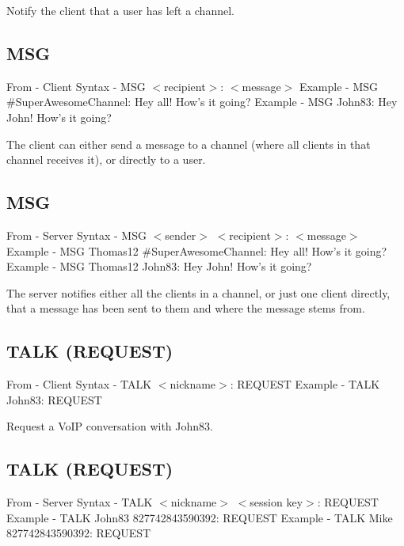 \documentclass[12pt]{rapport}
\begin{document}
\noindent Notify the client that a user has left a channel.

\subsection*{MSG}
From    - Client\newline
Syntax  - MSG $<$recipient$>$: $<$message$>$\newline
Example - MSG \#SuperAwesomeChannel: Hey all! How's it going?\newline
Example - MSG John83: Hey John! How's it going?\newline

\noindent The client can either send a message to a channel (where all
clients in that channel receives it), or directly to a user.

\subsection*{MSG}
From    - Server\newline
Syntax  - MSG $<$sender$>$ $<$recipient$>$: $<$message$>$\newline
Example - MSG Thomas12 \#SuperAwesomeChannel: Hey all! How's it going?\newline
Example - MSG Thomas12 John83: Hey John! How's it going?\newline

\noindent The server notifies either all the clients in a channel, or
just one client directly, that a message has been sent to them and
where the message stems from.

\subsection*{TALK (REQUEST)}
From    - Client\newline
Syntax  - TALK $<$nickname$>$: REQUEST\newline
Example - TALK John83: REQUEST\newline

\noindent Request a VoIP conversation with John83.

\subsection*{TALK (REQUEST)}
From    - Server\newline
Syntax  - TALK $<$nickname$>$ $<$session key$>$: REQUEST\newline
Example - TALK John83 827742843590392: REQUEST\newline
Example - TALK Mike 827742843590392: REQUEST\newline
\end{document}
